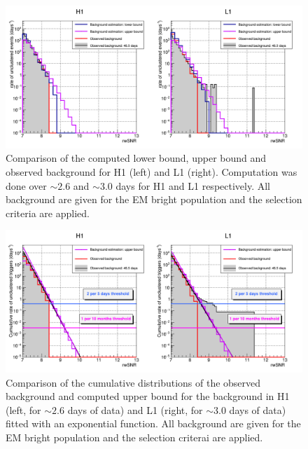 \begin{figure}
  \centering
  \includegraphics[width=\linewidth]{sectionO4/cPosterO4_HL.png}
  \caption{Comparison of the computed lower bound, upper bound and observed background for H1 (left) and L1 (right). Computation was done over $\sim 2.6$ and $\sim 3.0$ days for H1 and L1 respectively. All background are given for the EM bright population and the selection criteria are applied.}
  \label{fig:computed_bkg_O4}
\end{figure}
%
\begin{figure}
  \centering
  \includegraphics[width=\linewidth]{sectionO4/cPosterCumO4_HL.png}
  \caption{Comparison of the cumulative distributions of the observed background and computed upper bound for the background in H1 (left, for $\sim 2.6$ days of data) and L1 (right, for $\sim 3.0$ days of data) fitted with an exponential function. All background are given for the EM bright population and the selection criterai are applied.}
  \label{fig:cumulative_bkg_O4}
\end{figure}
